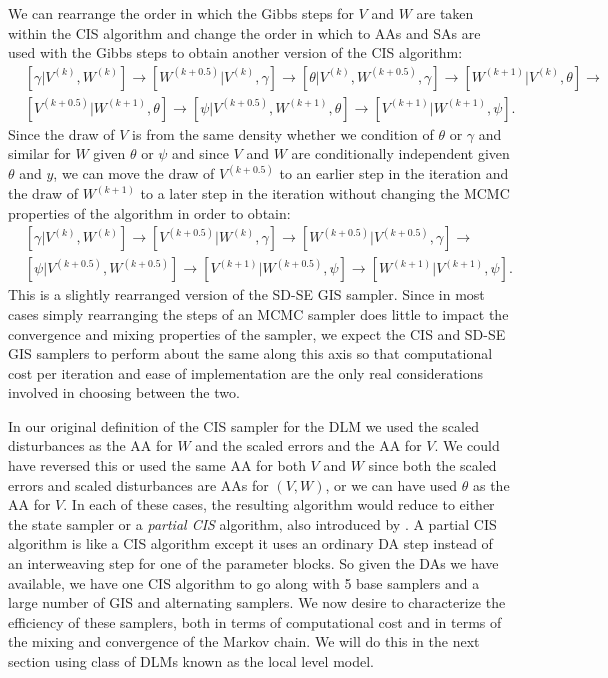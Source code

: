 \documentclass[12pt]{article}
\begin{document}
We can rearrange the order in which the Gibbs steps for $V$ and $W$ are taken within the CIS algorithm and change the order in which to AAs and SAs are used with the Gibbs steps to obtain another version of the CIS algorithm:
\begin{align*}
&[\gamma|V^{(k)},W^{(k)}] \to [W^{(k+0.5)}|V^{(k)},\gamma] \to [\theta|V^{(k)},W^{(k+0.5)},\gamma] \to [W^{(k+1)}|V^{(k)},\theta]\to \\
&[V^{(k+0.5)}|W^{(k+1)},\theta] \to [\psi|V^{(k+0.5)},W^{(k+1)},\theta] \to [V^{(k+1)}|W^{(k+1)},\psi].
\end{align*}
Since the draw of $V$ is from the same density whether we condition of $\theta$ or $\gamma$ and similar for $W$ given $\theta$ or $\psi$ and since $V$ and $W$ are conditionally independent given $\theta$ and $y$, we can move the draw of $V^{(k+0.5)}$ to an earlier step in the iteration and the draw of $W^{(k+1)}$ to a later step in the iteration without changing the MCMC properties of the algorithm in order to obtain:
\begin{align*}
&[\gamma|V^{(k)},W^{(k)}] \to [V^{(k+0.5)}|W^{(k)},\gamma] \to[W^{(k+0.5)}|V^{(k+0.5)},\gamma] \to \\
&[\psi|V^{(k+0.5)},W^{(k+0.5)}]\to [V^{(k+1)}|W^{(k+0.5)},\psi]\to [W^{(k+1)}|V^{(k+1)},\psi].
\end{align*}
This is a slightly rearranged version of the SD-SE GIS sampler. Since in most cases simply rearranging the steps of an MCMC sampler does little to impact the convergence and mixing properties of the sampler, we expect the CIS and SD-SE GIS samplers to perform about the same along this axis so that computational cost per iteration and ease of implementation are the only real considerations involved in choosing between the two.

In our original definition of the CIS sampler for the DLM we used the scaled disturbances as the AA for $W$ and the scaled errors and the AA for $V$. We could have reversed this or used the same AA for both $V$ and $W$ since both the scaled errors and scaled disturbances are AAs for $(V,W)$, or we can have used $\theta$ as the AA for $V$. In each of these cases, the resulting algorithm would reduce to either the state sampler or a {\it partial CIS} algorithm, also introduced by \citet{yu2011center}. A partial CIS algorithm is like a CIS algorithm except it uses an ordinary DA step instead of an interweaving step for one of the parameter blocks. So given the DAs we have available, we have one CIS algorithm to go along with 5 base samplers and a large number of GIS and alternating samplers. We now desire to characterize the efficiency of these samplers, both in terms of computational cost and in terms of the mixing and convergence of the Markov chain. We will do this in the next section using class of DLMs known as the local level model.
\end{document}
